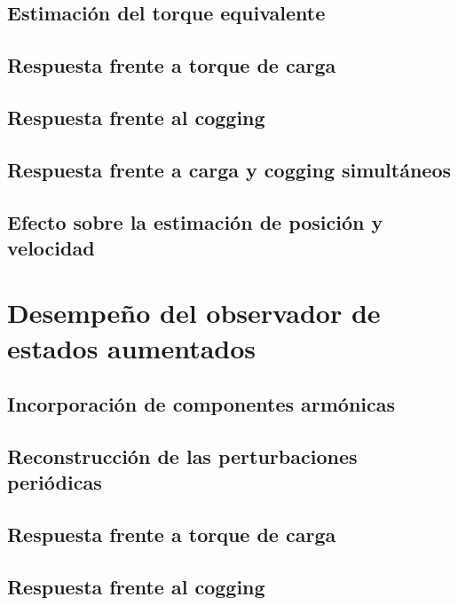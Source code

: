 \subsection{Estimación del torque equivalente}

\subsection{Respuesta frente a torque de carga}

\subsection{Respuesta frente al cogging}

\subsection{Respuesta frente a carga y cogging simultáneos}

\subsection{Efecto sobre la estimación de posición y velocidad}


\section{Desempeño del observador de estados aumentados}

\subsection{Incorporación de componentes armónicas}

\subsection{Reconstrucción de las perturbaciones periódicas}

\subsection{Respuesta frente a torque de carga}

\subsection{Respuesta frente al cogging}

